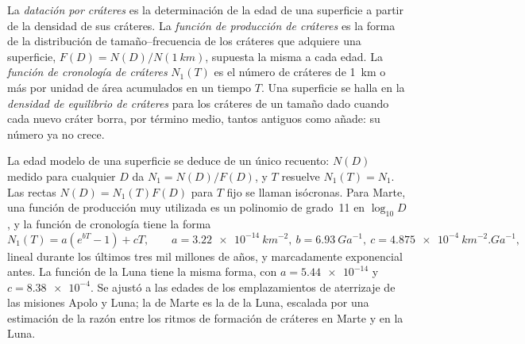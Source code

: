 \begin{definition}\label{def:b3:planetary-interiors-surfaces:crater-dating}
La \emph{datación por cráteres} es la determinación de la edad
de una superficie a partir de la densidad de sus cráteres. La \emph{función de producción
de cráteres} es la forma de la
distribución de tamaño--frecuencia de los cráteres que adquiere una superficie, $F(D) =
N(D)/N(\qty{1}{km})$, supuesta la misma a cada edad. La \emph{función de
cronología de cráteres} $N_1(T)$ es el
número de cráteres de \qty{1}{km} o más por unidad de área acumulados en un
tiempo $T$. Una superficie se halla en la \emph{densidad de equilibrio
de cráteres} para los cráteres de un tamaño dado
cuando cada nuevo cráter borra, por término medio, tantos antiguos como añade:
su número ya no crece.
\end{definition}

La edad modelo de una superficie se deduce de un único recuento: $N(D)$ medido para cualquier
$D$ da $N_1 = N(D)/F(D)$, y $T$ resuelve $N_1(T) = N_1$. Las rectas
$N(D) = N_1(T)F(D)$ para $T$ fijo se llaman isócronas. Para Marte, una función de producción muy
utilizada es un polinomio de grado~11 en $\log_{10}D$, y la
función de cronología tiene la forma
\[
  N_1(T) = a\left(e^{bT} - 1\right) + cT , \qquad
  a = \qty{3.22e-14}{km^{-2}}, \ b = \qty{6.93}{Ga^{-1}}, \
  c = \qty{4.875e-4}{km^{-2}.Ga^{-1}} ,
\]
lineal durante los últimos tres mil millones de años, y marcadamente exponencial antes. La
función de la Luna tiene la misma forma, con $a = \num{5.44e-14}$ y $c =
\num{8.38e-4}$. Se ajustó a las edades de los emplazamientos de aterrizaje de las misiones Apolo y
Luna; la de Marte es la de la Luna, escalada por una estimación de la razón entre
los ritmos de formación de cráteres en Marte y en la Luna.

